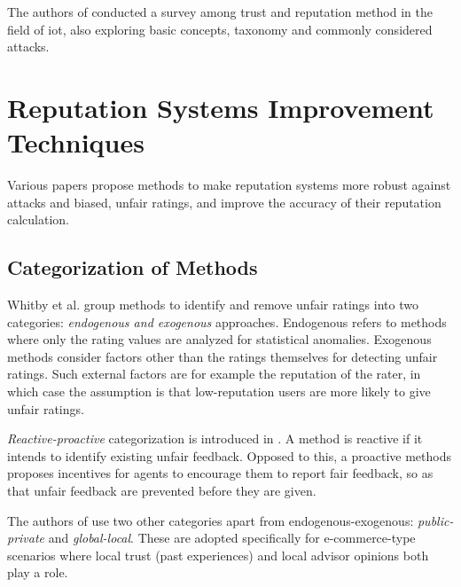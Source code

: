 \documentclass[%
    ]{\PathToTumTemplate/thesis/tum_thesis}
\begin{document}
The authors of \cite{ahmed_trust_2019} conducted a survey among trust and reputation method in the field of \gls{iot}, also exploring basic concepts, taxonomy and commonly considered attacks.



\section{Reputation Systems Improvement Techniques}\label{sec:related_improvements}

Various papers propose methods to make reputation systems more robust against attacks and biased, unfair ratings, and improve the accuracy of their reputation calculation.


\subsection{Categorization of Methods}

Whitby et al. group methods to identify and remove unfair ratings into two categories: \emph{endogenous and exogenous} approaches\cite{whitby_filtering_2014}.
Endogenous refers to methods where only the rating values are analyzed for statistical anomalies.
Exogenous methods consider factors other than the ratings themselves for detecting unfair ratings.
Such external factors are for example the reputation of the rater, in which case the assumption is that low-reputation users are more likely to give unfair ratings.

\emph{Reactive-proactive} categorization is introduced in \cite{thakur_reputation_2019}.
A method is reactive if it intends to identify existing unfair feedback.
Opposed to this, a proactive methods proposes incentives for agents to encourage them to report fair feedback, so as that unfair feedback are prevented before they are given.

The authors of \cite{zhang_detailed_2008} use two other categories apart from endogenous-exogenous: \emph{public-private} and \emph{global-local}.
These are adopted specifically for e-commerce-type scenarios where local trust (past experiences) and local advisor opinions both play a role.
\end{document}
